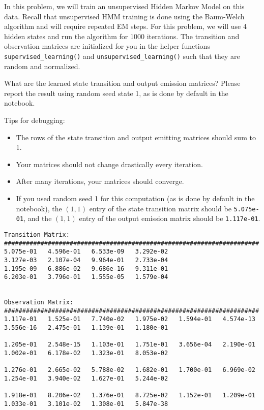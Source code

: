 In this problem, we will train an unsupervised Hidden Markov Model on this data. Recall that unsupervised HMM training is done using the Baum-Welch algorithm and will require repeated EM steps. For this problem, we will use 4 hidden states and run the algorithm for 1000 iterations. The transition and observation matrices are initialized for you in the helper functions \texttt{supervised\_learning()} and \texttt{unsupervised\_learning()} such that they are random and normalized.

What are the learned state transition and output emission matrices? Please report the result using random seed state 1, as is done by default in the notebook.

Tips for debugging:
\begin{itemize}
  \item The rows of the state transition and output emitting matrices should sum to 1.
  \item Your matrices should not change drastically every iteration.
  \item After many iterations, your matrices should converge.
  \item If you used random seed 1 for this computation (as is done by default in the notebook), the \((1,1)\) entry of the state transition matrix should be \verb|5.075e-01|, and the \((1,1)\) entry of the output emission matrix should be \verb|1.117e-01|.
\end{itemize}

\begin{solution}

\begin{verbatim}
Transition Matrix:
######################################################################
5.075e-01   4.596e-01   6.533e-09   3.292e-02   
3.127e-03   2.107e-04   9.964e-01   2.733e-04   
1.195e-09   6.886e-02   9.686e-16   9.311e-01   
6.203e-01   3.796e-01   1.555e-05   1.579e-04   


Observation Matrix:  
######################################################################
1.117e-01   1.525e-01   7.740e-02   1.975e-02   1.594e-01   4.574e-13
3.556e-16   2.475e-01   1.139e-01   1.180e-01

1.205e-01   2.548e-15   1.103e-01   1.751e-01   3.656e-04   2.190e-01
1.002e-01   6.178e-02   1.323e-01   8.053e-02

1.276e-01   2.665e-02   5.788e-02   1.682e-01   1.700e-01   6.969e-02
1.254e-01   3.940e-02   1.627e-01   5.244e-02

1.918e-01   8.206e-02   1.376e-01   8.725e-02   1.152e-01   1.209e-01
1.033e-01   3.101e-02   1.308e-01   5.847e-38 
\end{verbatim}
\end{solution}

